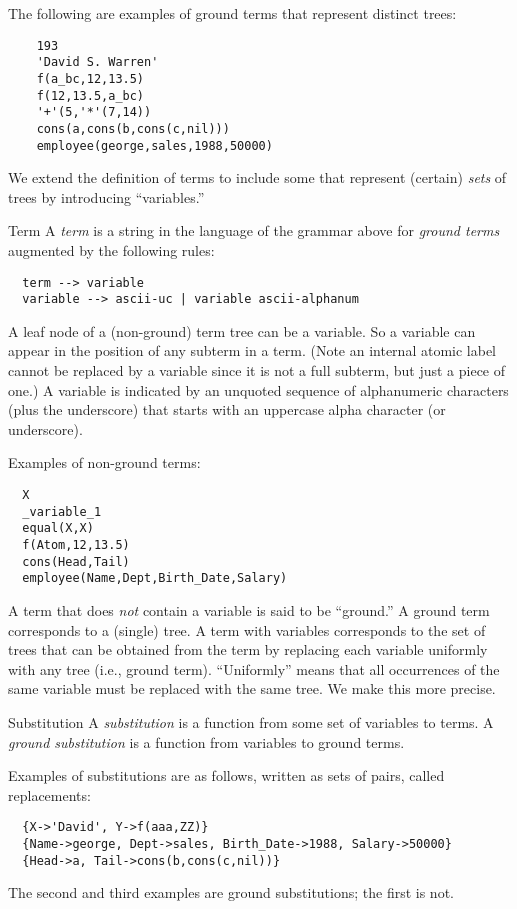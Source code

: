 \begin{example}
  The following are examples of ground terms that represent distinct
  trees:
\begin{verbatim}
    193
    'David S. Warren'
    f(a_bc,12,13.5)
    f(12,13.5,a_bc)
    '+'(5,'*'(7,14))
    cons(a,cons(b,cons(c,nil)))
    employee(george,sales,1988,50000)
\end{verbatim}
\end{example}

We extend the definition of terms to include some that represent
(certain) {\em sets} of trees by introducing ``variables.''
\begin{definition}{Term}
  A {\em term} is a string in the language of the grammar above for {\em
    ground terms} augmented by the following rules:
\begin{verbatim}
  term --> variable
  variable --> ascii-uc | variable ascii-alphanum
\end{verbatim}
\end{definition}
A leaf node of a (non-ground) term tree can be a variable.  So a
variable can appear in the position of any subterm in a term.  (Note
an internal atomic label cannot be replaced by a variable since it is
not a full subterm, but just a piece of one.)  A variable is indicated
by an unquoted sequence of alphanumeric characters (plus the
underscore) that starts with an uppercase alpha character (or
underscore).
\begin{example}
  Examples of non-ground terms:
\begin{verbatim}
  X
  _variable_1
  equal(X,X)
  f(Atom,12,13.5)
  cons(Head,Tail)
  employee(Name,Dept,Birth_Date,Salary)
\end{verbatim}
\end{example}
A term that does {\em not} contain a variable is said to be
``ground.''  A ground term corresponds to a (single) tree.  A term
with variables corresponds to the set of trees that can be obtained
from the term by replacing each variable uniformly with any tree
(i.e., ground term).  ``Uniformly'' means that all occurrences of the
same variable must be replaced with the same tree.  We make this more
precise.

\begin{definition}{Substitution}
A {\em substitution} is a function from some set of variables to
terms.  A {\em ground substitution} is a function from variables to
ground terms.
\end{definition}
\begin{example}
Examples of substitutions are as follows, written as sets of pairs,
called replacements:
\begin{verbatim}
  {X->'David', Y->f(aaa,ZZ)}
  {Name->george, Dept->sales, Birth_Date->1988, Salary->50000}
  {Head->a, Tail->cons(b,cons(c,nil))}
\end{verbatim}
The second and third examples are ground substitutions; the first is
not.
\end{example}

